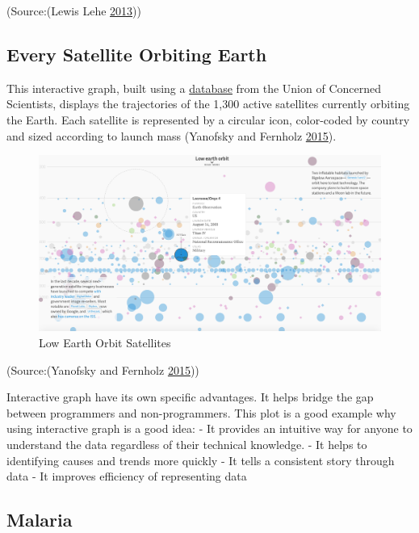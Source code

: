 \documentclass[]{book}
\theoremstyle{definition}
\theoremstyle{definition}
\theoremstyle{definition}
\theoremstyle{remark}
\begin{document}
(Source:(Lewis Lehe \protect\hyperlink{ref-simpson_paradox}{2013}))

\subsection{Every Satellite Orbiting
Earth}\label{every-satellite-orbiting-earth}

This interactive graph, built using a
\href{https://www.ucsusa.org/nuclear-weapons/space-weapons/satellite-database\#.WxbaMVMvzq1}{database}
from the Union of Concerned Scientists, displays the trajectories of the
1,300 active satellites currently orbiting the Earth. Each satellite is
represented by a circular icon, color-coded by country and sized
according to launch mass (Yanofsky and Fernholz
\protect\hyperlink{ref-Satellite}{2015}).

\begin{figure}
\centering
\includegraphics{images/satellites.png}
\caption{Low Earth Orbit Satellites}
\end{figure}

(Source:(Yanofsky and Fernholz \protect\hyperlink{ref-Satellite}{2015}))

Interactive graph have its own specific advantages. It helps bridge the
gap between programmers and non-programmers. This plot is a good example
why using interactive graph is a good idea: - It provides an intuitive
way for anyone to understand the data regardless of their technical
knowledge. - It helps to identifying causes and trends more quickly - It
tells a consistent story through data - It improves efficiency of
representing data

\subsection{Malaria}\label{malaria}
\end{document}
